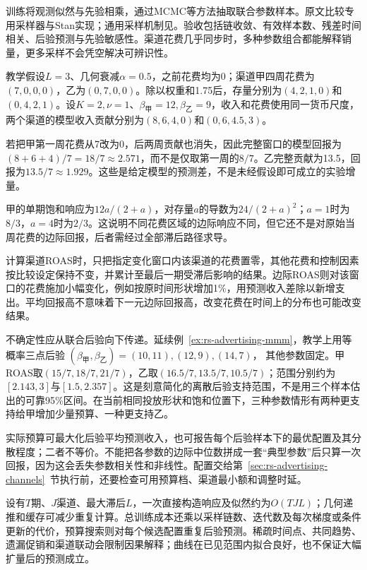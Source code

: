 训练将观测似然与先验相乘，通过MCMC等方法抽取联合参数样本。原文比较专用采样器与Stan实现；通用采样机制见。验收包括链收敛、有效样本数、残差时间相关、后验预测与先验敏感性。渠道花费几乎同步时，多种参数组合都能解释销量，更多采样不会凭空解决可辨识性。

\begin{example}[两渠道的滞后与回报]
\label{ex:rs-advertising-mmm}
教学假设$L=3$、几何衰减$\alpha=0.5$，之前花费均为0；渠道甲四周花费为$(7,0,0,0)$，乙为$(0,7,0,0)$。除以权重和1.75后，存量分别为$(4,2,1,0)$和$(0,4,2,1)$。设$K=2,\nu=1$、$\beta_{\text{甲}}=12,\beta_{\text{乙}}=9$，收入和花费使用同一货币尺度，两个渠道的模型收入贡献分别为$(8,6,4,0)$和$(0,6,4.5,3)$。

若把甲第一周花费从7改为0，后两周贡献也消失，因此完整窗口的模型回报为$(8+6+4)/7=18/7\approx2.571$，而不是仅取第一周的$8/7$。乙完整贡献为13.5，回报为$13.5/7\approx1.929$。这些是给定模型的预测差，不是未经假设即可成立的实验增量。

甲的单期饱和响应为$12a/(2+a)$，对存量$a$的导数为$24/(2+a)^2$；$a=1$时为$8/3$，$a=4$时为$2/3$。这说明不同花费区域的边际响应不同，但它还不是对原始当周花费的边际回报，后者需经过全部滞后路径求导。
\end{example}

计算渠道ROAS时，只把指定变化窗口内该渠道的花费置零，其他花费和控制因素按比较设定保持不变，并累计至最后一期受滞后影响的结果。边际ROAS则对该窗口的花费施加小幅变化，例如按原时间形状增加1\%，用预测收入差除以新增支出。平均回报高不意味着下一元边际回报高，改变花费在时间上的分布也可能改变结果。

不确定性应从联合后验向下传递。延续例~\ref{ex:rs-advertising-mmm}，教学上用等概率三点后验
$(\beta_{\text{甲}},\beta_{\text{乙}})=(10,11),(12,9),(14,7)$，
其他参数固定。甲ROAS取$(15/7,18/7,21/7)$，乙取$(16.5/7,13.5/7,10.5/7)$；范围分别约为$[2.143,3]$与$[1.5,2.357]$。这是刻意简化的离散后验支持范围，不是用三个样本估出的可靠95\%区间。在当前相同投放形状和饱和位置下，三种参数情形有两种更支持给甲增加少量预算、一种更支持乙。

实际预算可最大化后验平均预测收入，也可报告每个后验样本下的最优配置及其分散程度；二者不等价。不能把各参数的边际中位数拼成一套“典型参数”后只算一次回报，因为这会丢失参数相关性和非线性。配置交给第~\ref{sec:rs-advertising-channels}~节执行前，还要检查可用预算档、渠道最小额和调整时延。

设有$T$期、$J$渠道、最大滞后$L$，一次直接构造响应及似然约为$O(TJL)$；几何递推和缓存可减少重复计算。总训练成本还乘以采样链数、迭代数及每次梯度或条件更新的代价，预算搜索则对每个候选配置重复后验预测。稀疏时间点、共同趋势、遗漏促销和渠道联动会限制因果解释；曲线在已见范围内拟合良好，也不保证大幅扩量后的预测成立。

